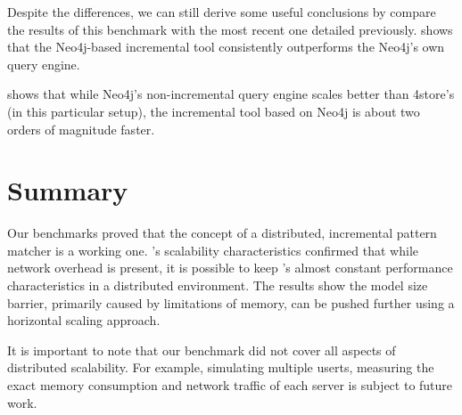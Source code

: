 Despite the differences, we can still derive some useful conclusions by compare the results of this benchmark with the most recent one detailed previously.  shows that the Neo4j-based incremental tool consistently outperforms the Neo4j's own query engine.


 shows that while Neo4j's non-incremental query engine scales better than 4store's (in this particular setup), the incremental tool based on Neo4j is about two orders of magnitude faster.



\section{Summary}



Our benchmarks proved that the concept of a distributed, incremental pattern matcher is a working one. \iqd{}'s scalability characteristics confirmed that while network overhead is present, it is possible to keep \eiq{}'s almost constant performance characteristics in a distributed environment. The results show the model size barrier, primarily caused by limitations of memory, %
can be pushed further using a horizontal scaling approach.

It is important to note that our benchmark did not cover all aspects of distributed scalability. For example, simulating multiple userts, measuring the exact memory consumption and network traffic of each server is subject to future work.


